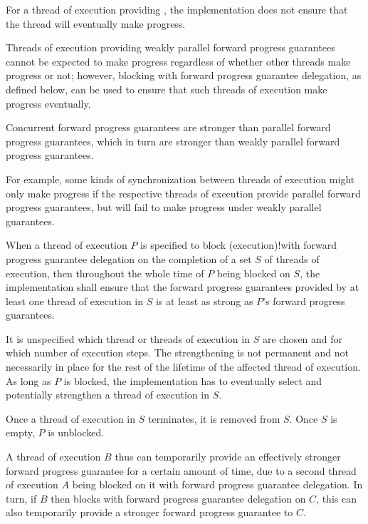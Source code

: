 \pnum
{}%
For a thread of execution providing , the implementation does not ensure that the thread will eventually
make progress.

\pnum
\begin{note}
Threads of execution providing weakly parallel forward progress guarantees cannot
be expected to make progress regardless of whether other threads make progress or
not; however, blocking with forward progress guarantee delegation, as defined below,
can be used to ensure that such threads of execution make progress eventually.
\end{note}

\pnum
Concurrent forward progress guarantees are stronger than parallel forward progress
guarantees, which in turn are stronger than weakly parallel forward progress
guarantees.
\begin{note}
For example, some kinds of synchronization between threads of execution might only
make progress if the respective threads of execution provide parallel forward progress
guarantees, but will fail to make progress under weakly parallel guarantees.
\end{note}

\pnum
{}%
When a thread of execution $P$ is specified to
{block (execution)!with forward progress guarantee delegation}
on the completion of a set $S$ of threads of execution,
then throughout the whole time of $P$ being blocked on $S$,
the implementation shall ensure that the forward progress guarantees
provided by at least one thread of execution in $S$
is at least as strong as $P$'s forward progress guarantees.
\begin{note}
It is unspecified which thread or threads of execution in $S$ are chosen
and for which number of execution steps. The strengthening is not permanent and
not necessarily in place for the rest of the lifetime of the affected thread of
execution. As long as $P$ is blocked, the implementation has to eventually
select and potentially strengthen a thread of execution in $S$.
\end{note}
Once a thread of execution in $S$ terminates, it is removed from $S$.
Once $S$ is empty, $P$ is unblocked.

\pnum
\begin{note}
A thread of execution $B$ thus can temporarily provide an effectively
stronger forward progress guarantee for a certain amount of time, due to a
second thread of execution $A$ being blocked on it with forward
progress guarantee delegation. In turn, if $B$ then blocks with
forward progress guarantee delegation on $C$, this can also temporarily
provide a stronger forward progress guarantee to $C$.
\end{note}

